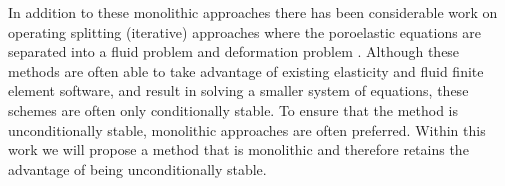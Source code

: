 In addition to these monolithic approaches there has been considerable work on operating splitting (iterative) approaches where the poroelastic equations are separated into a fluid problem and deformation problem \citep{wheeler2007iteratively,feng2010fully,kim2011stability}. Although these methods are often able to take advantage of existing elasticity and fluid finite element software, and result in solving a smaller system of equations, these schemes are often only conditionally stable. To ensure that the method is unconditionally stable, monolithic approaches are often preferred. Within this work we will propose a method that is monolithic and therefore retains the advantage of being unconditionally stable.








